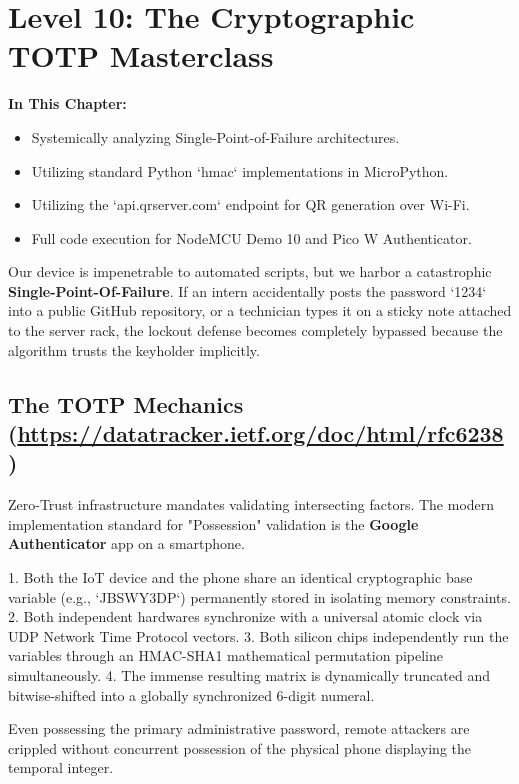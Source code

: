 \chapter{Level 10: The Cryptographic TOTP Masterclass}

\textbf{In This Chapter:}
\begin{itemize}
    \item Systemically analyzing Single-Point-of-Failure architectures.
    \item Utilizing standard Python `hmac` implementations in MicroPython.
    \item Utilizing the `api.qrserver.com` endpoint for QR generation over Wi-Fi.
    \item Full code execution for NodeMCU Demo 10 and Pico W Authenticator.
\end{itemize}

Our device is impenetrable to automated scripts, but we harbor a catastrophic \textbf{Single-Point-Of-Failure}. If an intern accidentally posts the password `1234` into a public GitHub repository, or a technician types it on a sticky note attached to the server rack, the lockout defense becomes completely bypassed because the algorithm trusts the keyholder implicitly. 

\section{The TOTP Mechanics (\url{https://datatracker.ietf.org/doc/html/rfc6238})}
Zero-Trust infrastructure mandates validating intersecting factors. The modern implementation standard for "Possession" validation is the \textbf{Google Authenticator} app on a smartphone.

1. Both the IoT device and the phone share an identical cryptographic base variable (e.g., `JBSWY3DP`) permanently stored in isolating memory constraints.
2. Both independent hardwares synchronize with a universal atomic clock via UDP Network Time Protocol vectors.
3. Both silicon chips independently run the variables through an HMAC-SHA1 mathematical permutation pipeline simultaneously.
4. The immense resulting matrix is dynamically truncated and bitwise-shifted into a globally synchronized 6-digit numeral.

Even possessing the primary administrative password, remote attackers are crippled without concurrent possession of the physical phone displaying the temporal integer. 

